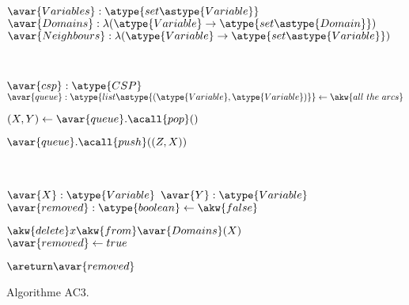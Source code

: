 \begin{figure}

\begin{center}
\begin{algorithmic}

\State $\avar{Variables}: \atype{set\astype{Variable}}$
\State $\avar{Domains}: \lambda (\atype{Variable} \rightarrow \atype{set\astype{Domain}})$
\State $\avar{Neighbours}: \lambda (\atype{Variable} \rightarrow \atype{set\astype{Variable}})$

\\\hrulefill


  \Require $\avar{csp}: \atype{CSP}$
  \State $\avar{queue}: \atype{list\astype{(\atype{Variable}, \atype{Variable})}} \gets \akw{all~the~arcs}$


      \State $(X, Y) \gets \avar{queue}.\acall{pop}()$



              \State $\avar{queue}.\acall{push}((Z, X))$

          \EndFor

      \EndIf

  \EndWhile

\EndFunction

\\\hrulefill


    \Require $\avar{X}: \atype{Variable}$
    \Require $\avar{Y}: \atype{Variable}$
    \Ensure  $\avar{removed}: \atype{boolean} \gets \akw{false}$



            \State $\akw{delete} x \akw{from} \avar{Domains}(X)$
            \State $\avar{removed} \gets true$

        \EndIf

    \EndFor

    \State $\areturn \avar{removed}$

\EndFunction

\end{algorithmic}
\end{center}

\caption{\label{figure:data:ac3} Algorithme AC3.}

\end{figure}

